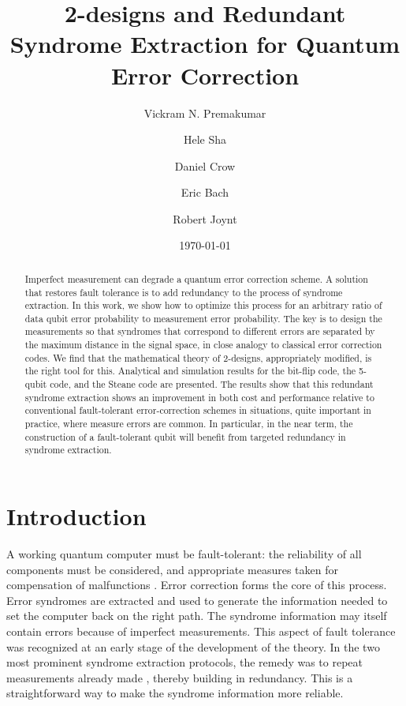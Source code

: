 \documentclass[reprint, superscriptaddress]{revtex4-1}
\numberwithin{equation}{section}
\numberwithin{figure}{section}
\numberwithin{table}{section}
\begin{document}
\title{ 2-designs and Redundant Syndrome Extraction for Quantum Error Correction }
\author{Vickram N. Premakumar}
\address{Physics Department, University of Wisconsin-Madison, 1150 Univ. Ave., Madison, WI, USA}
\author{Hele Sha}
\address{Physics Department, University of Wisconsin-Madison, 1150 Univ. Ave., Madison, WI, USA}
\author{Daniel Crow}
\address{Physics Department, University of Wisconsin-Madison, 1150 Univ. Ave., Madison, WI, USA}
\author{Eric Bach}
\address{Computer Science Department, University of Wisconsin-Madison, Madison, WI, USA}
\author{Robert Joynt}
\address{Physics Department, University of Wisconsin-Madison, 1150 Univ. Ave., Madison, WI, USA}
\address{
Kavli Institute for Theoretical Sciences, University of Chinese Academy of Sciences, Beijing 100190, China}
\date{{\normalsize \today}}

\begin{abstract}
Imperfect measurement can degrade a quantum error correction scheme.  A solution that restores fault tolerance is to add redundancy to the process of syndrome extraction.  In this work, we show how to optimize this process for an arbitrary ratio of data qubit error probability to measurement error probability.  The key is to design the measurements so that syndromes that correspond to different errors are separated by the maximum distance in the signal space, in close analogy to classical error correction codes.  We find that the mathematical theory of 2-designs, appropriately modified, is the right tool for this.  Analytical and simulation results for the bit-flip code, the 5-qubit code, and the Steane code are presented. The results show that this redundant syndrome extraction shows an improvement in both cost and performance relative to conventional fault-tolerant error-correction schemes in situations, quite important in practice, where measure errors are common. In particular, in the near term, the construction of a fault-tolerant qubit will benefit from targeted redundancy in syndrome extraction.       
\end{abstract}

\maketitle

\section{Introduction}
A working quantum computer must be fault-tolerant: the reliability of all components must be considered, and appropriate measures taken for compensation of malfunctions \cite{Shor1996, Preskill1999}.  Error correction forms the core of this process.  Error syndromes are extracted and used to generate the information needed to set the computer back on the right path.
The syndrome information may itself contain errors because of imperfect measurements.  This aspect of fault tolerance was recognized at an early stage of the development of the theory. In the two most prominent syndrome extraction protocols, the remedy was to repeat measurements already made \cite{Steane1996, Divincenzo1996}, thereby building in redundancy.  This is a straightforward way to make the syndrome information more reliable.
\end{document}
